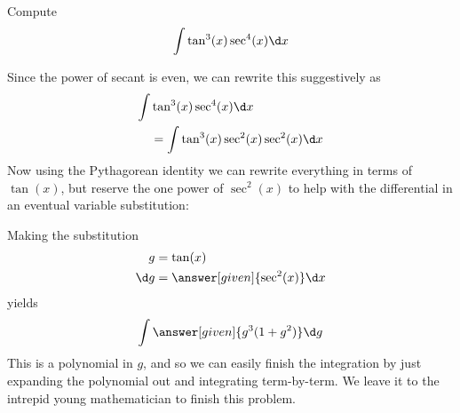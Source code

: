 \documentclass{ximera}
\begin{document}
\begin{example}
  Compute
  \[
  \int \tan^3(x) \sec^4(x) \d x
  \]
  \begin{explanation}
    Since the power of secant is even, we can rewrite this suggestively as
    \begin{align*}
    \int &\tan^3(x) \sec^4(x) \d x \\
    &= \int\tan^3(x) \sec^2(x) \sec^2(x) \d x
    \end{align*}
    Now using the Pythagorean identity we can rewrite everything in
    terms of $\tan(x)$, but reserve the one power of $\sec^2(x)$ to help
    with the differential in an eventual variable substitution:
    \begin{center}%
    \end{center}
    Making the substitution
    \begin{align*}
      g &= \tan(x)\\
      \d g &=\answer[given]{\sec^2(x)} \d x
    \end{align*}
    yields
    \[
    \int \answer[given]{g^3(1+g^2)} \d g
    \]
    This is a polynomial in $g$, and so we can easily finish the
    integration by just expanding the polynomial out and integrating
    term-by-term. We leave it to the intrepid young mathematician to
    finish this problem.
  \end{explanation}
\end{example}
\end{document}
